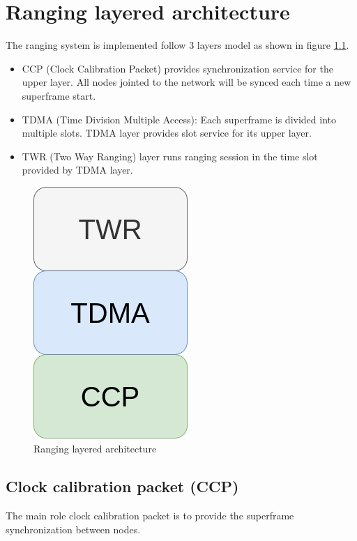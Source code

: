 \documentclass[../../main.tex]{subfiles}
\begin{document}
\graphicspath{{imgs/}{03_firmware/imgs/}}

\chapter{Ranging layered architecture}

The ranging system is implemented follow 3 layers model as shown in figure \ref{fig:ranging_layered_architecture}. 
\begin{itemize}
    \item CCP (Clock Calibration Packet) provides synchronization service for the upper layer. All nodes jointed to the network will be synced each time a new superframe start.
    \item TDMA (Time Division Multiple Access): Each superframe is divided into multiple slots. TDMA layer provides slot service for its upper layer. 
    \item TWR (Two Way Ranging) layer runs ranging session in the time slot provided by TDMA layer.
\end{itemize}
\begin{figure}[H]
    \begin{center}
        \includegraphics[scale=0.3]{ranging_layered_architecture}
    \end{center}
    \caption{Ranging layered architecture}
    \label{fig:ranging_layered_architecture}
\end{figure}

\section{Clock calibration packet (CCP)}
The main role clock calibration packet is to provide the superframe synchronization between nodes. 
\end{document}
